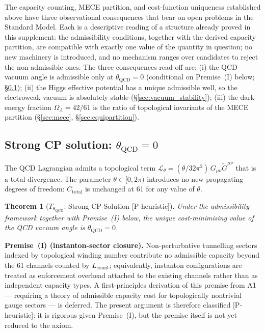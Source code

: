 \documentclass[11pt,a4paper]{article}
\newtheorem{theorem}{Theorem}[section]
\theoremstyle{definition}
\begin{document}

The capacity counting, MECE partition, and cost-function uniqueness
established above have three observational consequences that bear on
open problems in the Standard Model.  Each is a descriptive reading
of a structure already proved in this supplement: the admissibility
conditions, together with the derived capacity partition, are
compatible with exactly one value of the quantity in question; no new
machinery is introduced, and no mechanism ranges over candidates to
reject the non-admissible ones.  The three consequences read off are:
(i) the QCD vacuum angle is admissible only at $\theta_{\mathrm{QCD}} =
0$ (conditional on Premise~(I) below; \S\ref{sec:theta_QCD});
(ii) the Higgs effective potential has a unique admissible well, so
the electroweak vacuum is absolutely stable (\S\ref{sec:vacuum_stability});
(iii) the dark-energy fraction $\Omega_\Lambda = 42/61$ is the ratio of
topological invariants of the MECE partition (\S\ref{sec:mece},
\S\ref{sec:equipartition}).


\subsection{Strong CP solution: $\theta_{\mathrm{QCD}} = 0$}
\label{sec:theta_QCD}

The QCD Lagrangian admits a topological term
$\mathcal{L}_\theta = (\theta/32\pi^2)\,G_{\mu\nu}\tilde{G}^{\mu\nu}$
that is a total divergence.  The parameter $\theta \in [0, 2\pi)$
introduces no new propagating degrees of freedom: $C_{\mathrm{total}}$
is unchanged at 61 for any value of $\theta$.

\begin{theorem}[$T_{\theta_{\mathrm{QCD}}}$: Strong CP Solution \textnormal{[P-heuristic]}]
\label{thm:theta_QCD}
Under the admissibility framework together with Premise~(I) below, the
unique cost-minimising value of the QCD vacuum angle is
$\theta_{\mathrm{QCD}} = 0$.
\end{theorem}

\noindent\textbf{Premise~(I) (instanton-sector closure).}\quad
Non-perturbative tunnelling sectors indexed by topological winding
number contribute no admissible capacity beyond the 61 channels
counted by $L_{\mathrm{count}}$; equivalently, instanton configurations
are treated as enforcement overhead attached to the existing channels
rather than as independent capacity types.  A first-principles
derivation of this premise from A1 --- requiring a theory of
admissible capacity cost for topologically nontrivial gauge sectors
--- is deferred.  The present argument is therefore classified
[P-heuristic]: it is rigorous given Premise~(I), but the premise
itself is not yet reduced to the axiom.
\end{document}
